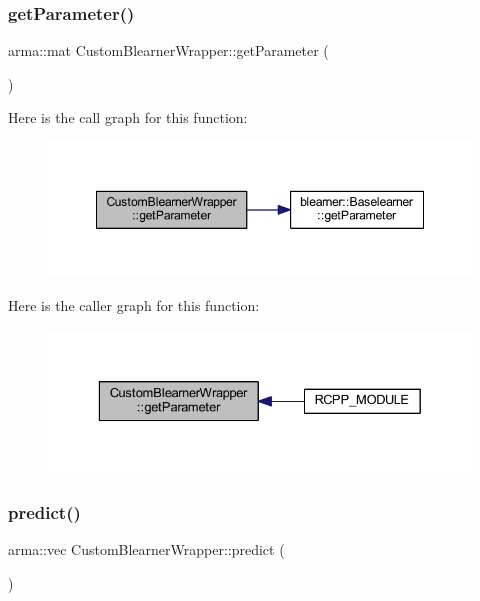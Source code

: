 \subsubsection{\texorpdfstring{get\+Parameter()}{getParameter()}}
{\footnotesize\ttfamily arma\+::mat Custom\+Blearner\+Wrapper\+::get\+Parameter (\begin{DoxyParamCaption}{ }\end{DoxyParamCaption})\hspace{0.3cm}{\ttfamily [inline]}}

Here is the call graph for this function\+:\nopagebreak
\begin{figure}[H]
\begin{center}
\leavevmode
\includegraphics[width=348pt]{class_custom_blearner_wrapper_ae012429cb317fae84ab8028c76c2b70d_cgraph}
\end{center}
\end{figure}
Here is the caller graph for this function\+:\nopagebreak
\begin{figure}[H]
\begin{center}
\leavevmode
\includegraphics[width=329pt]{class_custom_blearner_wrapper_ae012429cb317fae84ab8028c76c2b70d_icgraph}
\end{center}
\end{figure}
\mbox{\label{class_custom_blearner_wrapper_ac3c5d68400ea9473815ab2daed218473}} 
\subsubsection{\texorpdfstring{predict()}{predict()}}
{\footnotesize\ttfamily arma\+::vec Custom\+Blearner\+Wrapper\+::predict (\begin{DoxyParamCaption}{ }\end{DoxyParamCaption})\hspace{0.3cm}{\ttfamily [inline]}}

